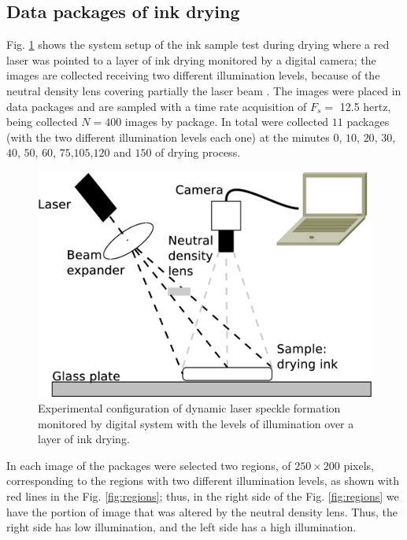 \documentclass[review]{elsarticle}
\begin{document}
\subsection{Data packages of ink drying}
\label{sec:descriptionink}
Fig. \ref{fig:system} shows the system setup of the ink sample test during drying where
a red laser was pointed to a layer of ink drying monitored by a digital camera;
the images are collected receiving two different illumination levels, because of the neutral 
density lens covering partially the laser beam \cite{REIS2016}.
The images were placed in data packages and
are sampled with a time rate acquisition of $F_s=$ 12.5 hertz, being 
collected $N=400$ images by package. In total were collected $11$ packages 
(with the two different illumination levels each one) at the minutes 
$0$, $10$, $20$, $30$, $40$, $50$, $60$, $75$,$105$,$120$ and $150$ of drying process. 
\begin{figure}[ht!]
\centering
\includegraphics[width=0.65\columnwidth]{system.eps}
\caption{Experimental configuration of dynamic laser speckle formation monitored by digital system with the levels of illumination over a layer of ink drying.}
\label{fig:system}
\end{figure}
In each image of the packages were selected two regions, of $250\times200$ pixels, 
corresponding to the regions with two different illumination levels, 
as shown with red lines in the Fig. \ref{fig:regions}; thus, 
in the right side of the Fig. \ref{fig:regions}  we have the
portion of image that was altered by the neutral density lens.
Thus, the right side has low illumination, and
the left side has a high illumination.
\end{document}
